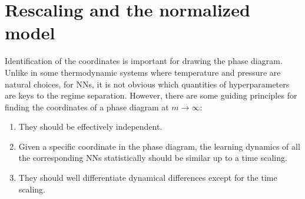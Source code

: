 \documentclass[twoside,11pt]{article}
\begin{document}
\section{Rescaling and the normalized model}\label{sec..Rescaling}
Identification of the coordinates is important for drawing the phase diagram. Unlike in some thermodynamic systems where temperature and pressure are natural choices, for NNs, it is not obvious which quantities of hyperparameters are keys to the regime separation. However, there are some guiding principles for finding the coordinates of a phase diagram at $m\to\infty$:
\begin{enumerate}[label=(\roman*)]
    \item They should be effectively independent.
    \item Given a specific coordinate in the phase diagram, the learning dynamics of all the corresponding NNs statistically should be similar up to a time scaling.
    \item They should well differentiate dynamical differences except for the time scaling.
\end{enumerate}
\end{document}
